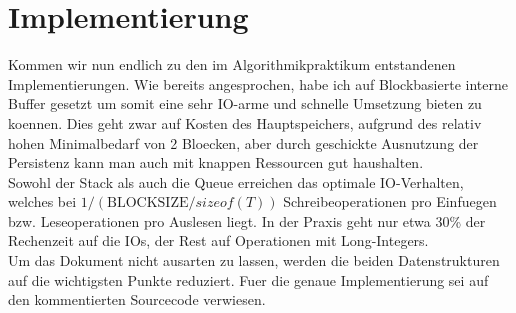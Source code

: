 \documentclass[10pt,a4paper]{article}
\begin{document}
\section{Implementierung}
Kommen wir nun endlich zu den im Algorithmikpraktikum entstandenen Implementierungen. Wie bereits angesprochen, habe ich auf Blockbasierte interne Buffer gesetzt um somit eine sehr IO-arme und schnelle Umsetzung bieten zu koennen. Dies geht zwar auf Kosten des Hauptspeichers, aufgrund des relativ hohen Minimalbedarf von 2 Bloecken, aber durch geschickte Ausnutzung der Persistenz kann man auch mit knappen Ressourcen gut haushalten. \\
Sowohl der Stack als auch die Queue erreichen das optimale IO-Verhalten, welches bei $1/(\text{BLOCKSIZE}/sizeof(T))$ Schreibeoperationen pro Einfuegen bzw. Leseoperationen pro Auslesen liegt. In der Praxis geht nur etwa 30\% der Rechenzeit auf die IOs, der Rest auf Operationen mit Long-Integers.\\
Um das Dokument nicht ausarten zu lassen, werden die beiden Datenstrukturen auf die wichtigsten Punkte reduziert. Fuer die genaue Implementierung sei auf den kommentierten Sourcecode verwiesen.
\end{document}
